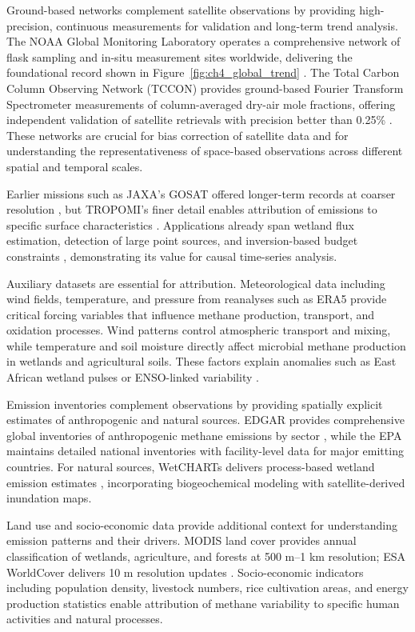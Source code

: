 Ground-based networks complement satellite observations by providing high-precision, continuous measurements for validation and long-term trend analysis. The NOAA Global Monitoring Laboratory operates a comprehensive network of flask sampling and in-situ measurement sites worldwide, delivering the foundational record shown in Figure~\ref{fig:ch4_global_trend} \cite{Dlugokencky2011}. The Total Carbon Column Observing Network (TCCON) provides ground-based Fourier Transform Spectrometer measurements of column-averaged dry-air mole fractions, offering independent validation of satellite retrievals with precision better than 0.25\% \cite{Wunch2011}. These networks are crucial for bias correction of satellite data and for understanding the representativeness of space-based observations across different spatial and temporal scales.

Earlier missions such as JAXA's GOSAT offered longer-term records at coarser resolution \cite{Parker2018}, but TROPOMI's finer detail enables attribution of emissions to specific surface characteristics \cite{Pandey2021, Zhang2020}. Applications already span wetland flux estimation, detection of large point sources, and inversion-based budget constraints \cite{Pandey2021, Zhang2020, Maasakkers2019}, demonstrating its value for causal time-series analysis.

Auxiliary datasets are essential for attribution. Meteorological data including wind fields, temperature, and pressure from reanalyses such as ERA5 \cite{Hersbach2020} provide critical forcing variables that influence methane production, transport, and oxidation processes. Wind patterns control atmospheric transport and mixing, while temperature and soil moisture directly affect microbial methane production in wetlands and agricultural soils. These factors explain anomalies such as East African wetland pulses \cite{Lunt2021} or ENSO-linked variability \cite{Parker2018}.

Emission inventories complement observations by providing spatially explicit estimates of anthropogenic and natural sources. EDGAR provides comprehensive global inventories of anthropogenic methane emissions by sector \cite{Crippa2020}, while the EPA maintains detailed national inventories with facility-level data for major emitting countries. For natural sources, WetCHARTs delivers process-based wetland emission estimates \cite{Bloom2017}, incorporating biogeochemical modeling with satellite-derived inundation maps.

Land use and socio-economic data provide additional context for understanding emission patterns and their drivers. MODIS land cover \cite{Friedl2010} provides annual classification of wetlands, agriculture, and forests at 500 m--1 km resolution; ESA WorldCover delivers 10 m resolution updates \cite{Lorente2021}. Socio-economic indicators including population density, livestock numbers, rice cultivation areas, and energy production statistics enable attribution of methane variability to specific human activities and natural processes.

